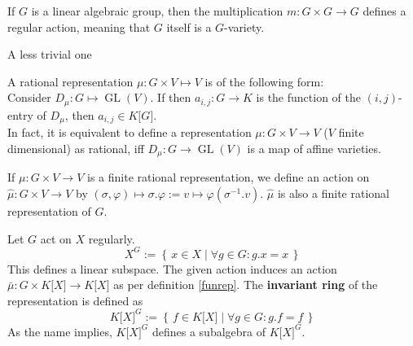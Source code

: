 \begin{dexample}
  If $G$ is a linear algebraic group, then the multiplication $m \colon G \times G \longrightarrow G$ defines a regular action, meaning that $G$ itself is a $G$-variety.
\end{dexample}

\begin{dexample}
  A less trivial one
\end{dexample}


\begin{remark}
  A rational representation $\mu \colon G \times V \longmapsto V$ is of the following form:\\
  Consider $D_{\mu} \colon G \longmapsto \operatorname{GL}(V)$.
  If then $ a_{i,j} : G \longrightarrow K $ is the function of the $\left( i,j \right) $-entry of $D_{\mu}$, then $ a_{i,j} \in K\lbrack G\rbrack $.\\
  In fact, it is equivalent to define a representation $\mu \colon G \times V \longrightarrow V$ ($V$ finite dimensional) as rational, iff $D_{\mu} \colon G \longrightarrow \operatorname{GL}(V)$ is a map of affine varieties.
\end{remark}

\begin{definition}
  If $\mu \colon G \times V \longrightarrow V$ is a finite rational representation, we define an action on $\hat{\mu} \colon G \times V \longrightarrow V$ by $(\sigma,\varphi) \mapsto \sigma.\varphi := v \mapsto \varphi(\sigma^{-1}.v)$.
  $\hat{\mu}$ is also a finite rational representation of $G$.
\end{definition}

\begin{definition}[Invariants]
  Let $ G $ act on $ X $ regularly.
  \begin{equation}
    X^G := \left\{\, x \in X \mid \forall g \in G : g . x = x \,\right\}
  \end{equation}
  This defines a linear subspace.
  The given action induces an action $ \bar{\mu} \colon G \times K\lbrack X\rbrack \longrightarrow K\lbrack X\rbrack $ as per definition \ref{funrep}.
  The \textbf{invariant ring} of the representation is defined as
  \begin{equation}
    K\lbrack X\rbrack^G := \left\{ \, f \in K\lbrack X \rbrack \mid \forall g \in G : g . f = f \, \right\}
  \end{equation}
  As the name implies, $ K\lbrack X\rbrack^G $ defines a subalgebra of $ K\lbrack X\rbrack^G $.
\end{definition}

